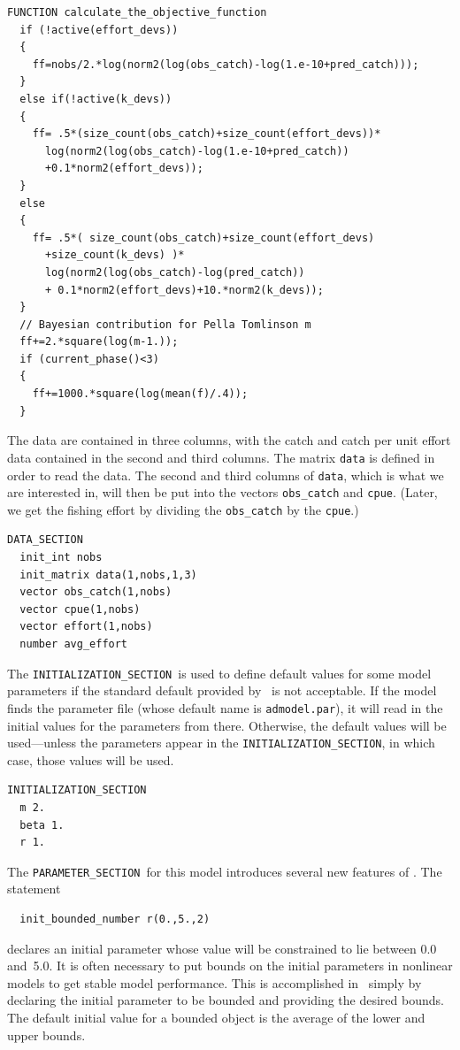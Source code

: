 \documentclass{admbmanual}
\newcommand\PS{\texttt{PARAMETER\_SECTION}}
\newcommand\IS{\texttt{INITIALIZATION\_SECTION}}
\begin{document}
\begin{lstlisting}
FUNCTION calculate_the_objective_function
  if (!active(effort_devs))
  {
    ff=nobs/2.*log(norm2(log(obs_catch)-log(1.e-10+pred_catch)));
  }
  else if(!active(k_devs))
  {
    ff= .5*(size_count(obs_catch)+size_count(effort_devs))*
      log(norm2(log(obs_catch)-log(1.e-10+pred_catch))
      +0.1*norm2(effort_devs));
  }
  else 
  {
    ff= .5*( size_count(obs_catch)+size_count(effort_devs)
      +size_count(k_devs) )*
      log(norm2(log(obs_catch)-log(pred_catch))
      + 0.1*norm2(effort_devs)+10.*norm2(k_devs));
  }
  // Bayesian contribution for Pella Tomlinson m
  ff+=2.*square(log(m-1.));
  if (current_phase()<3)
  {
    ff+=1000.*square(log(mean(f)/.4));
  }
\end{lstlisting}
The data are contained in three
columns, with the catch and catch per unit effort data contained
in the second and third columns. The matrix \texttt{data} is
defined in order to read the data. The second and third columns 
of \texttt{data}, which is what we are interested in, will then be put into
the vectors \texttt{obs\_catch} and \texttt{cpue}. (Later, we get the fishing
effort by dividing the \texttt{obs\_catch} by the \texttt{cpue}.)
\begin{lstlisting}
DATA_SECTION
  init_int nobs
  init_matrix data(1,nobs,1,3)
  vector obs_catch(1,nobs)
  vector cpue(1,nobs)
  vector effort(1,nobs)
  number avg_effort
\end{lstlisting}
The \IS\ is used to define default values for
some model parameters if the standard default provided by 
\ADM\ is not acceptable. 
If the model finds the parameter file (whose default name
is \texttt{admodel.par}), it will read in the initial values for
the parameters from there. Otherwise, the default values will be used---unless 
the parameters appear in the \IS, in which case, those 
values will be used. 
\begin{lstlisting}
INITIALIZATION_SECTION
  m 2.
  beta 1.
  r 1.
\end{lstlisting}
The \PS\ for this model  introduces several new features of \ADM.
The statement 
\begin{lstlisting}
  init_bounded_number r(0.,5.,2)
\end{lstlisting}
declares an initial parameter whose value will be constrained to lie
between 0.0 and~5.0. It is often necessary to put bounds on
the initial parameters in nonlinear models to 
get stable model performance. This is accomplished in
\ADM\ simply by declaring the initial parameter to
be bounded and providing the desired bounds. 
The default initial value for a bounded object is
the average of the lower and upper bounds.
\end{document}
